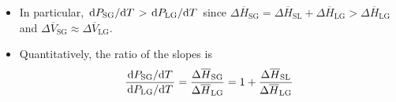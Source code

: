 \documentclass[../notes.tex]{subfiles}
\begin{document}
\begin{itemize}
\begin{itemize}
        \item In particular, $\dv*{P_\text{SG}}{T}>\dv*{P_\text{LG}}{T}$ since $\Delta\overline{H}_\text{SG}=\Delta\overline{H}_\text{SL}+\Delta\overline{H}_\text{LG}>\Delta\overline{H}_\text{LG}$ and $\Delta\overline{V}_\text{SG}\approx\Delta\overline{V}_\text{LG}$.
        \item Quantitatively, the ratio of the slopes is
        \begin{equation*}
            \frac{\dv*{P_\text{SG}}{T}}{\dv*{P_\text{LG}}{T}} = \frac{\Delta\overline{H}_\text{SG}}{\Delta\overline{H}_\text{LG}}
            = 1+\frac{\Delta\overline{H}_\text{SL}}{\Delta\overline{H}_\text{LG}}
        \end{equation*}
    \end{itemize}
\end{itemize}
\end{document}

